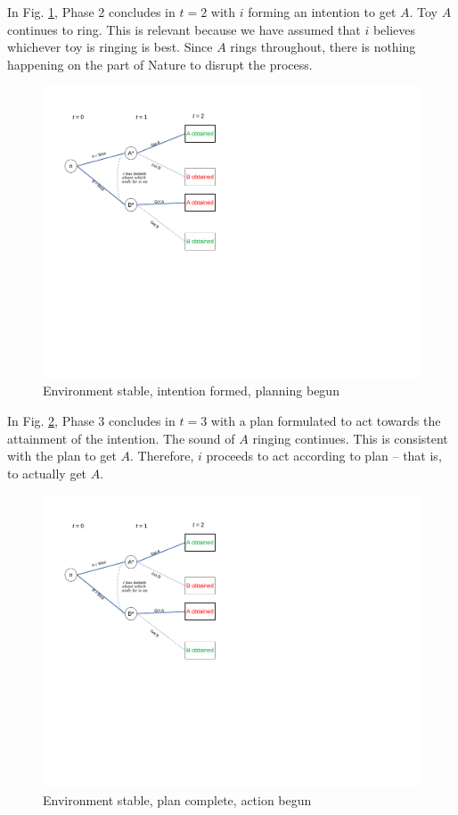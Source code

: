 \documentclass[
11pt,
titlepage,
reqno,
]{article}%
\theoremstyle{definition}
\begin{document}
In Fig. \ref{Diag: p-08}, Phase 2 concludes in $t=2$ with $i$ forming an intention to get $A$. Toy $A$ continues to ring. This is relevant because we have assumed that $i$ believes whichever toy is ringing is best. Since $A$ rings throughout, there is nothing happening on the part of Nature to disrupt the process. 

\begin{figure}[h!]
	\centering
	\includegraphics*[page=8,trim = 0 3.5in 0in 0in,scale=.6]{Awareness_Diagrams_All}
	\caption{Environment stable, intention formed, planning begun\label{Diag: p-08}}%
\end{figure}

In Fig. \ref{Diag: p-09}, Phase 3 concludes in $t=3$ with a plan formulated to act towards the attainment of the intention. The sound of $A$ ringing continues. This is consistent with the plan to get $A$. Therefore, $i$ proceeds to act according to plan -- that is, to actually get $A$. 

\begin{figure}[h!]
	\centering
	\includegraphics*[page=9,trim = 0in 5in 0in 0in,scale=.6]{Awareness_Diagrams_All}
	\caption{Environment stable, plan complete, action begun\label{Diag: p-09}}%
\end{figure}
\end{document}

